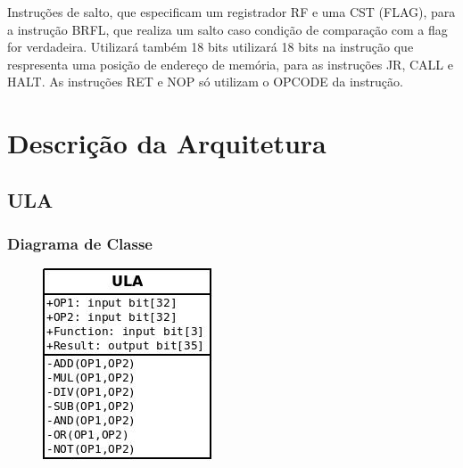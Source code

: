 \documentclass{report}
\begin{document}
\begin{itemize}
  Instruções de salto, que especificam um registrador RF e uma CST (FLAG), para a instrução BRFL, que realiza um salto caso condição de comparação com a flag for verdadeira. Utilizará também 18 bits  utilizará 18 bits na instrução que respresenta uma posição de endereço de memória, para as instruções JR, CALL e HALT. As instruções RET e NOP só utilizam o OPCODE da instrução.\\
  
  \end{itemize}

\chapter{Descrição da Arquitetura}

  \section{ULA}

    \subsection{Diagrama de Classe}
  \begin{figure}[H]
     	\centering
     	\includegraphics[scale=1.5]{./pictures/diagrams/ula.jpeg}
  \end{figure}      
     
\end{document}
